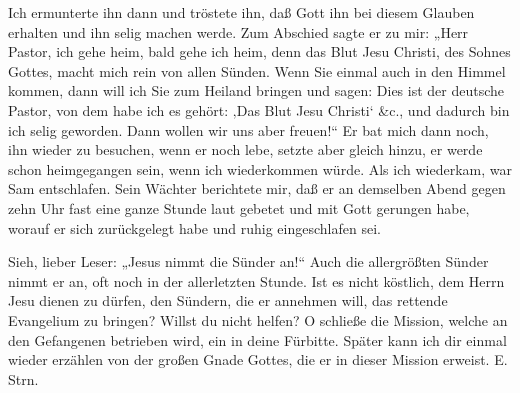 Ich ermunterte ihn dann und tröstete ihn, daß Gott ihn bei diesem Glauben erhalten und ihn selig machen werde. Zum Abschied sagte er zu mir: „Herr Pastor, ich gehe heim, bald gehe ich heim, denn das Blut Jesu Christi, des Sohnes Gottes, macht mich rein von allen Sünden. Wenn Sie einmal auch in den Himmel kommen, dann will ich Sie zum Heiland bringen und sagen: Dies ist der deutsche Pastor, von dem habe ich es gehört: ‚Das Blut Jesu Christi‘ \&c., und dadurch bin ich selig geworden.
Dann wollen wir uns aber freuen!“
Er bat mich dann noch, ihn wieder zu besuchen, wenn er noch lebe, setzte aber gleich hinzu, er werde schon heimgegangen sein, wenn ich wiederkommen würde. Als ich wiederkam, war Sam entschlafen. Sein Wächter berichtete mir, daß er an demselben Abend gegen zehn Uhr fast eine ganze Stunde laut gebetet und mit Gott gerungen habe, worauf er sich zurückgelegt habe und ruhig eingeschlafen sei.

Sieh, lieber Leser: „Jesus nimmt die Sünder an!“ Auch die allergrößten Sünder nimmt er an, oft noch in der allerletzten Stunde. Ist es nicht köstlich, dem Herrn Jesu dienen zu dürfen, den Sündern, die er annehmen will, das rettende Evangelium zu bringen? Willst du nicht helfen? O schließe die Mission, welche an den Gefangenen betrieben wird, ein in deine Fürbitte. Später kann ich dir einmal wieder erzählen von der großen Gnade Gottes, die er in dieser Mission erweist. E. Strn.
